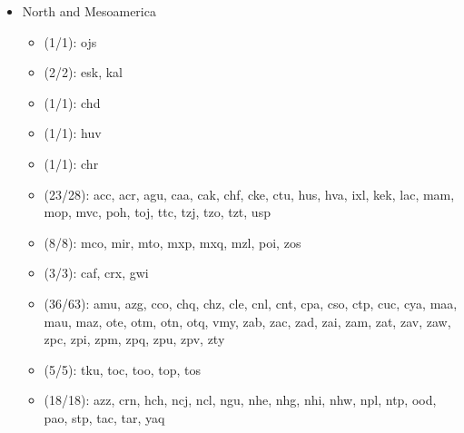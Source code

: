 \begin{itemize}[label={},leftmargin=0cm,labelindent=5pt,itemindent=0pt]
  \item North and Mesoamerica
    \begin{itemize}[label={},leftmargin=!,labelindent=5pt,itemindent=-15pt]
  	\item {} (1/1): ojs
  	\item {} (2/2): esk, kal
  	\item {} (1/1): chd
  	\item {} (1/1): huv
  	\item {} (1/1): chr
  	\item {} (23/28): acc, acr, agu, caa, cak, chf, cke, ctu, hus, hva, ixl, kek, lac, mam, mop, mvc, poh, toj, ttc, tzj, tzo, tzt, usp
  	\item {} (8/8): mco, mir, mto, mxp, mxq, mzl, poi, zos
  	\item {} (3/3): caf, crx, gwi
  	\item {} (36/63): amu, azg, cco, chq, chz, cle, cnl, cnt, cpa, cso, ctp, cuc, cya, maa, mau, maz, ote, otm, otn, otq, vmy, zab, zac, zad, zai, zam, zat, zav, zaw, zpc, zpi, zpm, zpq, zpu, zpv, zty
  	\item {} (5/5): tku, toc, too, top, tos
  	\item {} (18/18): azz, crn, hch, ncj, ncl, ngu, nhe, nhg, nhi, nhw, npl, ntp, ood, pao, stp, tac, tar, yaq
    \end{itemize}


\end{itemize}
